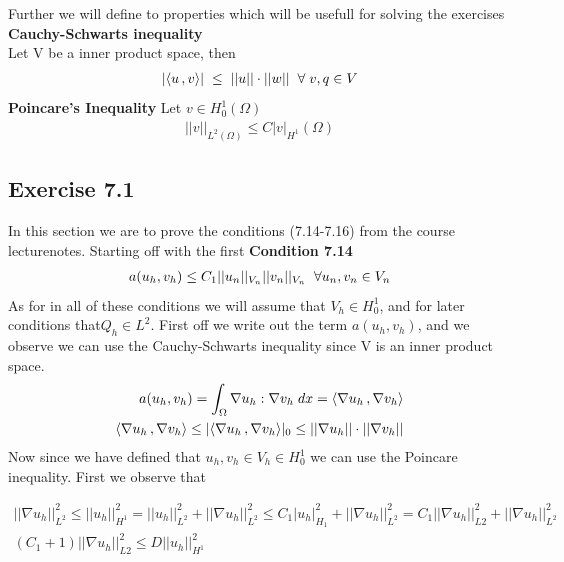 \documentclass[a4paper,norsk]{article}
\begin{document}
Further we will define to properties which will be usefull for solving the exercises \newline
\textbf{Cauchy-Schwarts inequality} \\
Let V be a inner product space, then
\begin{align*}
 |\langle u \,, v \rangle| \hspace{1mm} \leq \hspace{1mm} ||u|| \cdot ||w|| \hspace{2mm} \forall \hspace{1mm} v,q \in V
\end{align*}
\newline
\textbf{Poincare's Inequality}
Let $v \in H_0^1(\Omega)$
\begin{align*}
||v||_{L^2(\Omega)} \leq C |v|_{H^1} (\Omega) 
\end{align*}

\newpage
\subsection*{Exercise 7.1}
In this section we are to prove the conditions (7.14-7.16) from the course lecturenotes. 
Starting off with the first 
\textbf{Condition 7.14}
\begin{align*}
a(u_h, v_h) \leq C_1 ||u_n||_{V_n} ||v_n||_{V_n} \hspace{2mm} \forall u_n, v_n \in V_n
\end{align*}
As for in all of these conditions we will assume that $V_h \in H_0^1$, and for later conditions that$Q_h \in L^2$.
\newline
First off we write out the term $a(u_h, v_h)$, and we observe we can use the Cauchy-Schwarts inequality since
V is an inner product space. 
\begin{align*}
a(u_h, v_h) = \int_\Omega \nabla u_h : \nabla v_h \hspace{1mm} dx  = \langle \nabla u_h \,, \nabla v_h \rangle \\
\langle \nabla u_h \,, \nabla v_h \rangle \leq |\langle \nabla u_h \,, \nabla v_h \rangle|_0 \leq ||\nabla u_h||\cdot ||\nabla v_h||
\end{align*}
Now since we have defined that $u_h, v_h \in V_h \in H_0^1$ we can use the Poincare inequality. First we observe that

\begin{align*}
||\nabla u_h ||^2_{L^2} \leq ||u_h||^2_{H^1} = ||u_h||^2_{L^2} + ||\nabla u_h||^2_{L^2} \leq C_1 |u_h|^2_{H_1} +  ||\nabla u_h||^2_{L^2} =
C_1 ||\nabla u_h||^2_{L2} +  ||\nabla u_h||^2_{L^2} \\
(C_1 + 1) ||\nabla u_h||^2_{L2} \leq D ||u_h||^2_{H^1} 
\end{align*}
\end{document}
